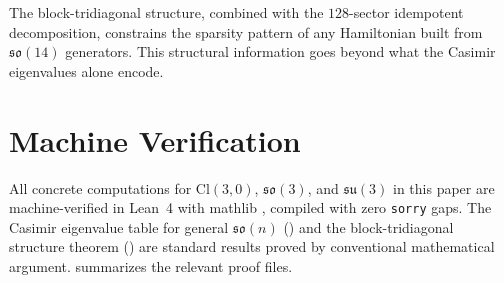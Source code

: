 \documentclass[11pt]{article}
\newcommand{\so}{\mathfrak{so}}
\newcommand{\su}{\mathfrak{su}}
\newcommand{\Cl}{\mathrm{Cl}}
\begin{document}
The block-tridiagonal structure, combined with the $128$-sector
idempotent decomposition, constrains the sparsity pattern of any
Hamiltonian built from $\so(14)$ generators. This structural
information goes beyond what the Casimir eigenvalues alone encode.

\section{Machine Verification}
\label{sec:verification}

All concrete computations for $\Cl(3,0)$, $\so(3)$, and $\su(3)$ in
this paper are machine-verified in Lean~4 \cite{demoura2021lean4}
with mathlib \cite{mathlib}, compiled with zero \texttt{sorry} gaps.
The Casimir eigenvalue table for general $\so(n)$ ()
and the block-tridiagonal structure theorem ()
are standard results proved by conventional mathematical argument.  summarizes the
relevant proof files.
\end{document}
